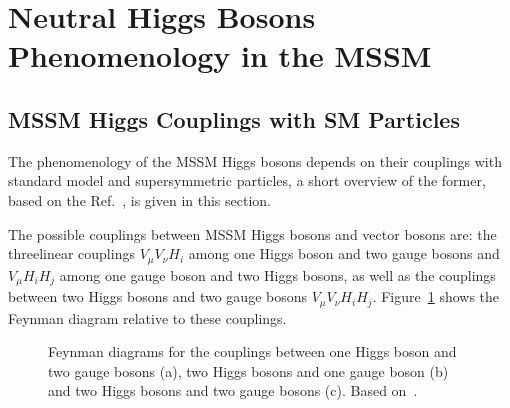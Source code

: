 \section{Neutral Higgs Bosons Phenomenology in the MSSM}\label{sec:pheno}

\subsection{MSSM Higgs Couplings with SM Particles}\label{sec:couplings}
The phenomenology of the MSSM Higgs bosons depends on their couplings with standard model and supersymmetric particles, 
a short overview of the former, based on the Ref.~\cite{Djuadi}, is given in this section.

The possible couplings between MSSM Higgs bosons and vector bosons 
are: the threelinear couplings $V_{\mu}V_{\nu}H_i$ among one Higgs boson and two gauge bosons and $V_{\mu}H_{i}H_j$ among one gauge boson and two Higgs bosons,
as well as the couplings between two Higgs bosons and two gauge bosons $V_{\mu}V_{\nu}H_iH_j$. Figure~\ref{fig:couplings} shows the Feynman diagram 
relative to these couplings.
\begin{figure}[tp]
     \begin{center}
     	\hspace{0.5cm}
     	\hspace{0.5cm}
     \end{center}
   \label{fig:couplings}
    \caption{Feynman diagrams for the couplings between one Higgs boson and two gauge bosons (a), two Higgs bosons and one gauge boson (b)
		and two Higgs bosons and two gauge bosons (c). Based on~\cite{Djuadi}. }
\end{figure}
